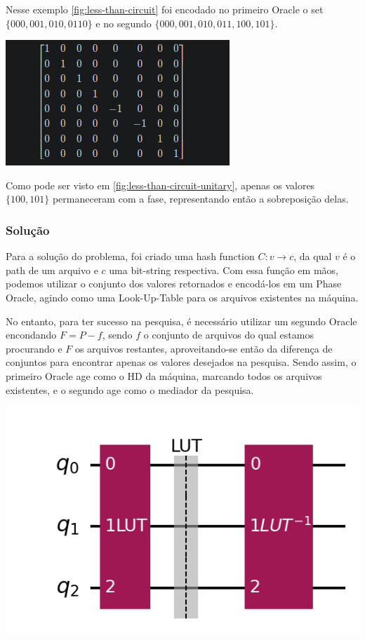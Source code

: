 \documentclass{article}
\begin{document}
Nesse exemplo \ref{fig:less-than-circuit} foi encodado no primeiro Oracle o set $\{000, 001, 010, 0110\}$ e no segundo $\{000, 001, 010, 011, 100, 101\}$.

\begin{center}
	\includegraphics[scale=0.5]{less_than_unitary.png}
	\label{fig:less-than-circuit-unitary}
\end{center}

Como pode ser visto em \ref{fig:less-than-circuit-unitary}, apenas os valores $\{100, 101\}$ permaneceram com a fase, representando então a sobreposição delas.


\subsubsection{Solução}

Para a solução do problema, foi criado uma hash function $C: v \to c$, da qual $v$ é o path de um arquivo e $c$ uma bit-string respectiva. Com essa função em mãos, podemos utilizar o conjunto dos valores retornados e encodá-los em um Phase Oracle, agindo como uma Look-Up-Table para os arquivos existentes na máquina.

No entanto, para ter sucesso na pesquisa, é necessário utilizar um segundo Oracle encondando $F = P-f$, sendo $f$ o conjunto de arquivos do qual estamos procurando e $F$ os arquivos restantes, aproveitando-se então da diferença de conjuntos para encontrar apenas os valores desejados na pesquisa.
Sendo assim, o primeiro Oracle age como o HD da máquina, marcando todos os arquivos existentes, e o segundo age como o mediador da pesquisa.

\begin{center}
	\includegraphics[scale=0.6]{sets-difference-look-up-table-oracle.png}
	\label{fig:luts}
\end{center}
\end{document}
